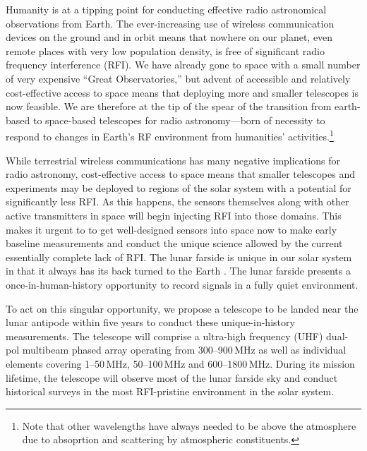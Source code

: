 Humanity is at a tipping point for conducting effective radio astronomical observations from Earth. The ever-increasing use of wireless communication devices on the ground and in orbit means that nowhere on our planet, even  remote places with very low population density, is free of significant radio frequency interference (RFI). We have already gone to space with a small number of very expensive ``Great Observatories,” but advent of accessible and relatively cost-effective access to space means that deploying more and smaller telescopes is now feasible. We are therefore at the tip of the spear of the transition from earth-based to space-based telescopes for radio astronomy---born of necessity to respond to changes in Earth’s RF environment from humanities' activities.\footnote{Note that other wavelengths have always needed to be above the atmosphere due to absoprtion and scattering by atmospheric constituents.}  

While terrestrial wireless communications has many negative implications for radio astronomy, cost-effective access to space means that smaller telescopes and experiments may be deployed to regions of the solar system with a potential for significantly less RFI. As this happens, the sensors themselves along with other active transmitters in space will begin injecting RFI into those domains. This makes it urgent to to get well-designed sensors into space now to make early baseline measurements and conduct the unique science allowed by the current essentially complete lack of RFI. The lunar farside is unique in our solar system in that it always has its back turned to the Earth \cite{heidmann2002,MACCONE2019233,michaud2020lunar}. The lunar farside presents a once-in-human-history opportunity to record signals in a fully quiet environment. 

To act on this singular opportunity, we propose a telescope to be landed near the lunar antipode within five years to conduct these unique-in-history measurements.  The telescope will comprise a ultra-high frequency (UHF) dual-pol multibeam phased array operating from 300--900\,MHz as well as individual elements covering 1--50\,MHz, 50--100\,MHz and 600--1800\,MHz. During its mission lifetime, the telescope will observe most of the lunar farside sky and conduct historical surveys in the most RFI-pristine environment in the solar system. 